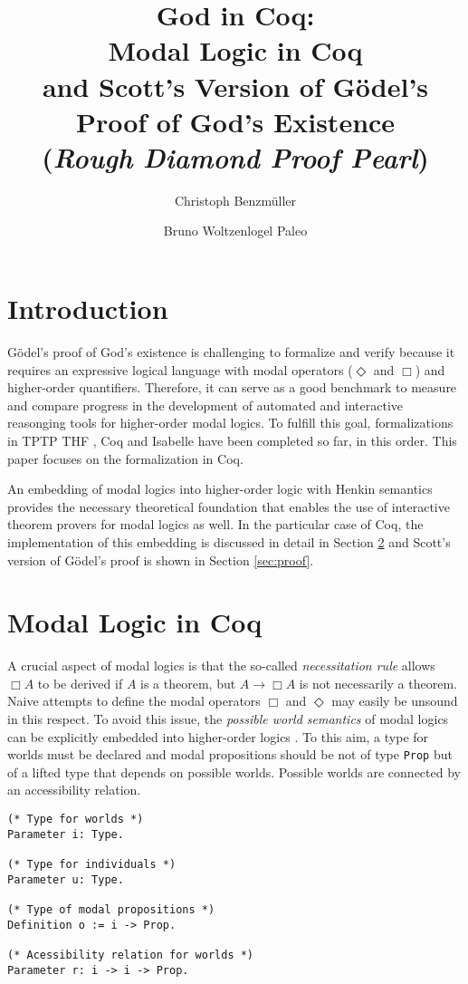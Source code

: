 \documentclass{llncs}
\title{
God in Coq: \\
Modal Logic in Coq \\ 
and Scott's Version of G\"{o}del's Proof of God's Existence \\
{\small (\emph{Rough Diamond Proof Pearl})}
}
\author{
  Christoph Benzm\"{u}ller\inst{1} 
  \and 
  Bruno Woltzenlogel Paleo\inst{2}
}
\institute{
  Dahlem Center for Intelligent Systems, Freie Universit\"{a}t Berlin, Germany\\
  \email{c.benzmueller@gmail.com}
  \and 
  Theory and Logic Group, Vienna University of Technology, Austria \\
  \email{bruno@logic.at}
}
\newcommand{\imp}{\rightarrow}
\begin{document}
\maketitle

\section{Introduction}

G\"{o}del's proof of God's existence is challenging 
to formalize and verify because it requires an 
expressive logical language with modal operators
($\Diamond$ and $\Box$) and
higher-order quantifiers. Therefore, it can serve as a good benchmark to measure and compare progress in the development of automated and interactive reasonging tools for higher-order modal logics. To fulfill this goal, formalizations \cite{FormalTheologyRepository} in TPTP THF \cite{J22}, Coq \cite{Coq} and Isabelle \cite{Isabelle} have been completed so far, in this order. This paper focuses on the formalization in Coq.

An embedding of modal logics 
into higher-order logic with
Henkin semantics \cite{J23,B9} provides the necessary theoretical foundation that enables the use of interactive theorem provers for modal logics as well. In the particular case of Coq, the implementation of this embedding is discussed in detail in Section \ref{sec:modal} and Scott's version of G\"odel's proof is shown in Section \ref{sec:proof}.


\section{Modal Logic in Coq}
\label{sec:modal}

A crucial aspect of modal logics \cite{ToDo} is that the so-called \emph{necessitation rule} allows $\Box A$ to be derived if $A$ is a theorem, but $A \imp \Box A$ is not necessarily a theorem. Naive attempts to define the modal operators $\Box$ and $\Diamond$ may easily be unsound in this respect. To avoid this issue, the \emph{possible world semantics} of modal logics can be explicitly embedded into higher-order logics \cite{J23,B9}. To this aim, a type for worlds must be declared and modal propositions should be not of type \texttt{Prop} but of a lifted type that depends on possible worlds. Possible worlds are connected by an accessibility relation.

\begin{verbatim}
(* Type for worlds *)
Parameter i: Type.

(* Type for individuals *)
Parameter u: Type.

(* Type of modal propositions *)
Definition o := i -> Prop.

(* Acessibility relation for worlds *)
Parameter r: i -> i -> Prop.
\end{verbatim}
\end{document}
